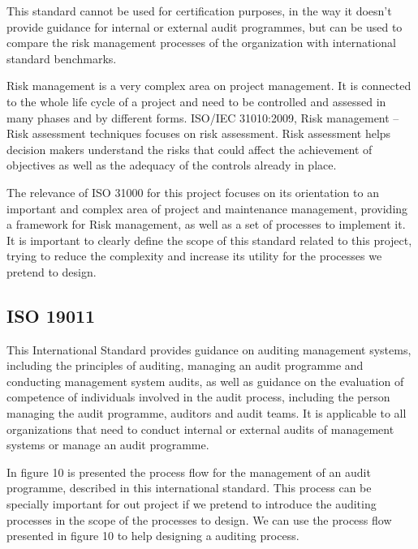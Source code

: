 This standard cannot be used for certification purposes, in the way it doesn't provide guidance for internal or external audit programmes, but can be used to compare the risk management processes of the organization with international standard benchmarks.\par
Risk management is a very complex area on project management. It is connected to the whole life cycle of a project and need to be controlled and assessed in many phases and by different forms. ISO/IEC 31010:2009, Risk management – Risk assessment techniques focuses on risk assessment. Risk assessment helps decision makers understand the risks that could affect the achievement of objectives as well as the adequacy of the controls already in place.\par
The relevance of ISO 31000 for this project focuses on its orientation to an important and complex area of project and maintenance management, providing a framework for Risk management, as well as a set of processes to implement it. It is important to clearly define the scope of this standard related to this project, trying to reduce the complexity and increase its utility for the processes we pretend to design.


\subsection{ISO 19011}

This International Standard provides guidance on auditing management systems, including the principles of auditing, managing an audit programme and conducting management system audits, as well as guidance on the evaluation of competence of individuals involved in the audit process, including the person managing the audit programme, auditors and audit teams. It is applicable to all organizations that need to conduct internal or external audits of management systems or manage an audit programme.\par
In figure 10 is presented the process flow for the management of an audit programme, described in this international standard. This process can be specially important for out project if we pretend to introduce the auditing processes in the scope of the processes to design. We can use the process flow presented in figure 10 to help designing a auditing process.

